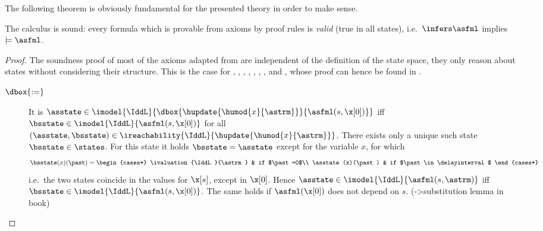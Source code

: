     The following theorem is obviously fundamental for the presented theory in order to make sense.

    \begin{theorem}\label{thm:ddL-soundness}
        The \ddL calculus is sound: every formula which is provable from \ddL axioms by \ddL proof rules is \emph{valid} (true in all states), i.e.\ $\infers\asfml$ implies $\models\asfml$.
    \end{theorem}
    \begin{proof}
        The soundness proof of most of the axioms adapted from \dL are independent of the definition of the state space, they only reason about states without considering their structure.
        This is the case for , %
        , , , , , ,  and , whose proof can hence be found in \cite{Platzer12Complete}.


    \begin{description}
        \item[$\dbox{:=}$]
        It is $\asstate\in\imodel{\IddL}{\dbox{\hupdate{\humod{x}{\astrm}}}{\asfml(s,\x[0])}}$ iff $\bsstate\in\imodel{\IddL}{\asfml(s,\x[0])}$ for all $(\asstate,\bsstate)\in\ireachability{\IddL}{\hupdate{\humod{x}{\astrm}}}$. There exists only a unique such state $\bsstate\in\states$. For this state it holds $\bsstate=\asstate$ except for the variable $x$, for which
        \begin{equation*}
            \bsstate(x)(\past) = \begin{cases*}
                    \ivaluation{\IddL}{\astrm} & if $\past=0$\\
                    \asstate(x)(\past) & if $\past\in\delayinterval$
                \end{cases*}
        \end{equation*}
        i.e.\ the two states coincide in the values for $\x[s]$, except in $\x[0]$. Hence $\asstate\in\imodel{\IddL}{\asfml(s,\astrm)}$ iff $\bsstate\in\imodel{\IddL}{\asfml(s,\x[0])}$.
        The same holds if $\asfml(\x[0])$ does not depend on $s$.
         (->substitution lemma in book)
        

\end{description}
\end{proof}
